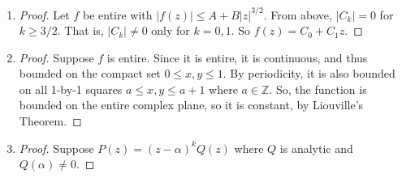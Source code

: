 \documentclass[11pt, letterpaper]{article}
\begin{document}
\begin{enumerate}
  \item \begin{proof}
    Let $f$ be entire with $\vert f(z) \vert \leq A + B \vert z \vert^{3/2}$. From above, $\vert C_k \vert = 0$ for $k \geq 3/2$. That is, $\vert C_k \vert \neq 0$ only for $k = 0, 1$. So $f(z) = C_0 + C_1 z$.
  \end{proof}

  \item \begin{proof}
    Suppose $f$ is entire. Since it is entire, it is continuous, and thus bounded on the compact set $0 \leq x, y \leq 1$. By periodicity, it is also bounded on all 1-by-1 squares $a \leq x, y \leq a + 1$ where $a \in \mathbb Z$. So, the function is bounded on the entire complex plane, so it is constant, by Liouville's Theorem.
  \end{proof}

  \item \begin{proof}
    Suppose $P(z) = (z - \alpha)^kQ(z)$ where $Q$ is analytic and $Q(\alpha) \neq 0$.
  \end{proof}
\end{enumerate}
\end{document}
